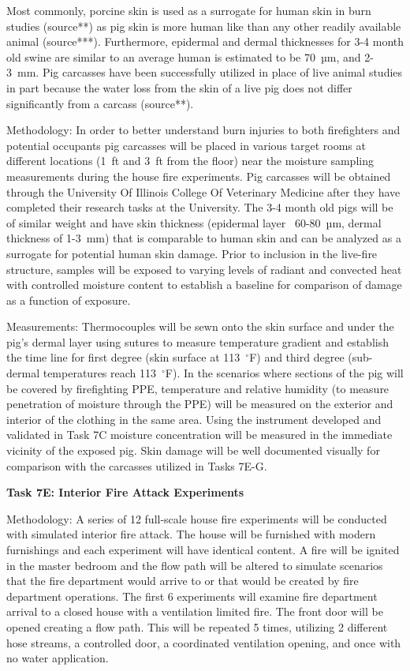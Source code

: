 \documentclass{article}
\begin{document}
\begin{itemize}
Most commonly, porcine skin is used as a surrogate for human skin in burn studies (source**) as pig skin is more human like than any other readily available animal (source***). Furthermore, epidermal and dermal thicknesses for 3-4 month old swine are similar to an average human is estimated to be 70~µm, and 2-3~mm. Pig carcasses have been successfully utilized in place of live animal studies in part because the water loss from the skin of a live pig does not differ significantly from a carcass (source**).

Methodology: In order to better understand burn injuries to both firefighters and potential occupants pig carcasses will be placed in various target rooms at different locations (1~ft and 3~ft from the floor) near the moisture sampling measurements during the house fire experiments. Pig carcasses will be obtained through the University Of Illinois College Of Veterinary Medicine after they have completed their research tasks at the University. The 3-4 month old pigs will be of similar weight and have skin thickness (epidermal layer ~60-80~µm, dermal thickness of 1-3~mm) that is comparable to human skin and can be analyzed as a surrogate for potential human skin damage. Prior to inclusion in the live-fire structure, samples will be exposed to varying levels of radiant and convected heat with controlled moisture content to establish a baseline for comparison of damage as a function of exposure.  

Measurements: Thermocouples will be sewn onto the skin surface and under the pig’s dermal layer using sutures to measure temperature gradient and establish the time line for first degree (skin surface at 113~$^{\circ}$F) and third degree (sub-dermal temperatures reach 113~$^{\circ}$F). In the scenarios where sections of the pig will be covered by firefighting PPE, temperature and relative humidity (to measure penetration of moisture through the PPE) will be measured on the exterior and interior of the clothing in the same area. Using the instrument developed and validated in Task 7C moisture concentration will be measured in the immediate vicinity of the exposed pig. Skin damage will be well documented visually for comparison with the carcasses utilized in Tasks 7E-G.
\vspace*{\baselineskip}

\subitem \bf{Task 7E:  Interior Fire Attack Experiments}
\normalfont
\vspace*{\baselineskip}

Methodology: A series of 12 full-scale house fire experiments will be conducted with simulated interior fire attack. The house will be furnished with modern furnishings and each experiment will have identical content.  A fire will be ignited in the master bedroom and the flow path will be altered to simulate scenarios that the fire department would arrive to or that would be created by fire department operations. The first 6 experiments will examine fire department arrival to a closed house with a ventilation limited fire. The front door will be opened creating a flow path. This will be repeated 5 times, utilizing 2 different hose streams, a controlled door, a coordinated ventilation opening, and once with no water application.  


\end{itemize}
\end{document}
